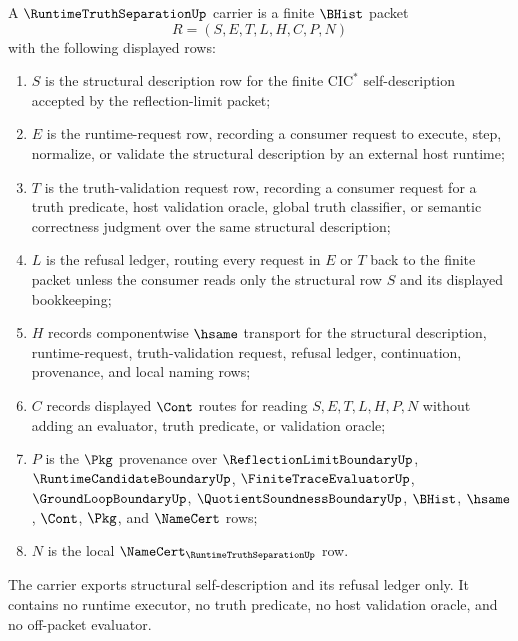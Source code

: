 \begin{definition}
\label{def:runtime-truth-separation-carrier}
A $\RuntimeTruthSeparationUp$ carrier is a finite $\BHist$ packet
$$
R=(S,E,T,L,H,C,P,N)
$$
with the following displayed rows:
\begin{enumerate}
\item $S$ is the structural description row for the finite $\mathrm{CIC}^{*}$ self-description accepted by the reflection-limit packet;
\item $E$ is the runtime-request row, recording a consumer request to execute, step, normalize, or validate the structural description by an external host runtime;
\item $T$ is the truth-validation request row, recording a consumer request for a truth predicate, host validation oracle, global truth classifier, or semantic correctness judgment over the same structural description;
\item $L$ is the refusal ledger, routing every request in $E$ or $T$ back to the finite packet unless the consumer reads only the structural row $S$ and its displayed bookkeeping;
\item $H$ records componentwise $\hsame$ transport for the structural description, runtime-request, truth-validation request, refusal ledger, continuation, provenance, and local naming rows;
\item $C$ records displayed $\Cont$ routes for reading $S,E,T,L,H,P,N$ without adding an evaluator, truth predicate, or validation oracle;
\item $P$ is the $\Pkg$ provenance over $\ReflectionLimitBoundaryUp$, $\RuntimeCandidateBoundaryUp$, $\FiniteTraceEvaluatorUp$, $\GroundLoopBoundaryUp$, $\QuotientSoundnessBoundaryUp$, $\BHist$, $\hsame$, $\Cont$, $\Pkg$, and $\NameCert$ rows;
\item $N$ is the local $\NameCert_{\RuntimeTruthSeparationUp}$ row.
\end{enumerate}
The carrier exports structural self-description and its refusal ledger only. It contains no runtime executor, no truth predicate, no host validation oracle, and no off-packet evaluator.
\end{definition}

